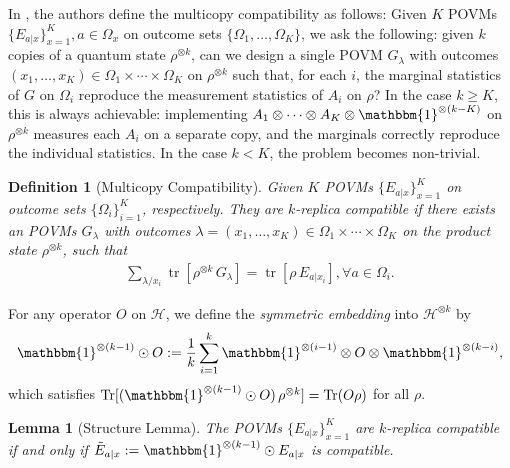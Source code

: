 \documentclass[aps,%
twocolumn,%
floatfix,%
pra,%
amsfonts,%
groupedaddress,%
superscriptaddress]{revtex4-2}%
\newtheorem{lemma}{Lemma}
\newtheorem{definition}{Definition}[section]
\DeclareMathOperator{\tr}{Tr}
\newcommand{\ox}{\otimes}
\newcommand{\1}{\mathbbm{1}}
\newcommand*{\cH}{\mathcal{H}}
\begin{document}
In \cite{carmeli2016quantum}, the authors define the multicopy compatibility as follows:
Given $K$ POVMs $\{E_{a|x}\}_{x = 1}^K, a \in \Omega_x$ on outcome sets $\{\Omega_1,\ldots,\Omega_K\}$, we ask the following: given $k$ copies of a quantum state $\rho^{\otimes k}$, can we design a single POVM $G_{\lambda}$ with outcomes $(x_1,\ldots,x_K) \in \Omega_1\times\cdots\times\Omega_K$ on $\rho^{\otimes k}$ such that, for each $i$, the marginal statistics of $G$ on $\Omega_i$ reproduce the measurement statistics of $A_i$ on $\rho$?
In the case $k \geq K$, this is always achievable: implementing $A_1\otimes \cdots \otimes A_K \otimes \1^{\otimes (k-K)}$ on $\rho^{\otimes k}$ measures each $A_i$ on a separate copy, and the marginals correctly reproduce the individual statistics.
In the case $k < K$, the problem becomes non-trivial.

\begin{definition}[Multicopy Compatibility]\label{def:multicopy-compatibility}
Given $K$ POVMs $\{E_{a|x}\}_{x = 1}^K$ on outcome sets $\{\Omega_i\}_{i=1}^K$, respectively.
They are $k$-replica compatible if there exists an POVMs $G_{\lambda}$ with outcomes $\lambda = (x_1,\ldots,x_K) \in \Omega_1\times\cdots\times\Omega_K$ on the product state $\rho^{\otimes k}$, such that
\begin{align}
\sum_{\lambda/x_i} \operatorname{tr}\!\left[\rho^{\otimes k}\, G_\lambda \right] = \operatorname{tr}\!\left[\rho\, E_{a|x_i}\right],\forall a \in \Omega_i.
\end{align}
\end{definition}

For any operator $O$ on $\cH$, we define the \emph{symmetric embedding} into $\cH^{\ox k}$ by
\begin{align}\label{eq:sym-embed}
\1^{\ox(k-1)}\odot O := \frac{1}{k}\sum_{i=1}^{k} \1^{\ox(i-1)}\ox O \ox \1^{\ox(k-i)},
\end{align}
which satisfies $\tr[(\1^{\ox(k-1)}\odot O)\,\rho^{\ox k}] = \tr(O\rho)$ for all $\rho$.

\begin{lemma}[Structure Lemma]\label{lem:structure-lemma}
The POVMs $\{E_{a|x}\}_{x = 1}^K$ are $k$-replica compatible if and only if
$\tilde{E}_{a|x} := \1^{\otimes(k-1)}\odot E_{a|x} $ is compatible.
\end{lemma}
\end{document}
